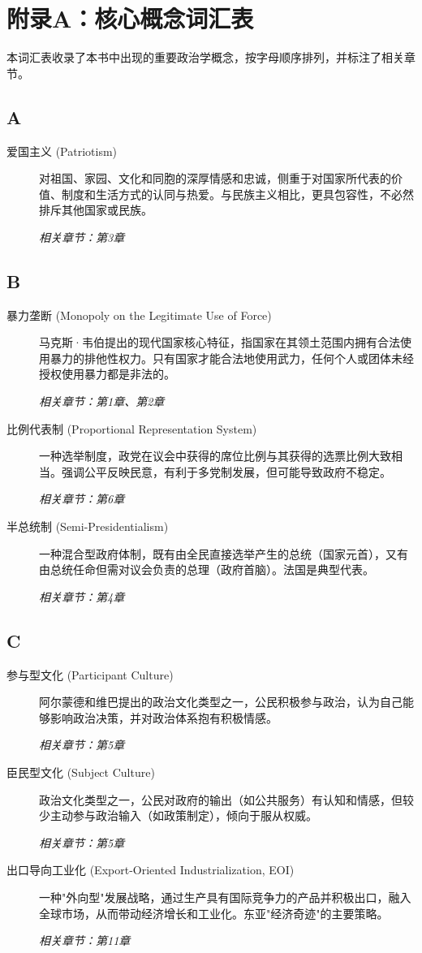 \chapter{附录A：核心概念词汇表}


本词汇表收录了本书中出现的重要政治学概念，按字母顺序排列，并标注了相关章节。

\section{A}
\begin{description}
    \item[爱国主义 (Patriotism)] 对祖国、家园、文化和同胞的深厚情感和忠诚，侧重于对国家所代表的价值、制度和生活方式的认同与热爱。与民族主义相比，更具包容性，不必然排斥其他国家或民族。 \par\textit{相关章节：第3章}
\end{description}

\section{B}
\begin{description}
    \item[暴力垄断 (Monopoly on the Legitimate Use of Force)] 马克斯·韦伯提出的现代国家核心特征，指国家在其领土范围内拥有合法使用暴力的排他性权力。只有国家才能合法地使用武力，任何个人或团体未经授权使用暴力都是非法的。 \par\textit{相关章节：第1章、第2章}
    \item[比例代表制 (Proportional Representation System)] 一种选举制度，政党在议会中获得的席位比例与其获得的选票比例大致相当。强调公平反映民意，有利于多党制发展，但可能导致政府不稳定。 \par\textit{相关章节：第6章}
    \item[半总统制 (Semi-Presidentialism)] 一种混合型政府体制，既有由全民直接选举产生的总统（国家元首），又有由总统任命但需对议会负责的总理（政府首脑）。法国是典型代表。 \par\textit{相关章节：第4章}
\end{description}

\section{C}
\begin{description}
    \item[参与型文化 (Participant Culture)] 阿尔蒙德和维巴提出的政治文化类型之一，公民积极参与政治，认为自己能够影响政治决策，并对政治体系抱有积极情感。 \par\textit{相关章节：第5章}
    \item[臣民型文化 (Subject Culture)] 政治文化类型之一，公民对政府的输出（如公共服务）有认知和情感，但较少主动参与政治输入（如政策制定），倾向于服从权威。 \par\textit{相关章节：第5章}
    \item[出口导向工业化 (Export-Oriented Industrialization, EOI)] 一种"外向型"发展战略，通过生产具有国际竞争力的产品并积极出口，融入全球市场，从而带动经济增长和工业化。东亚"经济奇迹"的主要策略。 \par\textit{相关章节：第11章}
\end{description}

